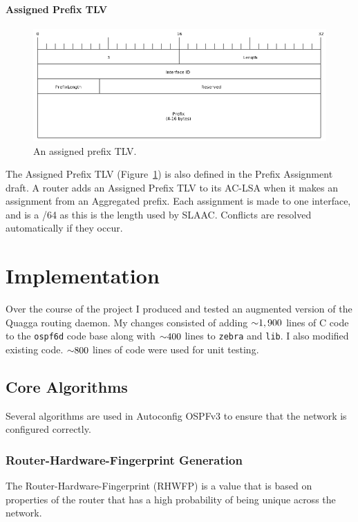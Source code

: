 \subsubsection{Assigned Prefix TLV}
\begin{figure}
\begin{center}
	\includegraphics[width=\linewidth]{../Diagrams/Packets/assigned_prefix_tlv.png}
	\caption{An assigned prefix TLV.}\label{fig:AssignedPrefix-TLV}
\end{center}
\end{figure}
The Assigned Prefix TLV (Figure~\ref{fig:AssignedPrefix-TLV}) is also defined
in the Prefix Assignment draft. A router adds an Assigned Prefix TLV to its
AC-LSA when it makes an assignment from an Aggregated prefix. Each assignment
is made to one interface, and is a /64 as this is the length used by SLAAC\@.
Conflicts are resolved automatically if they occur. 

\chapter{Implementation}
Over the course of the project I produced and tested an augmented version of
the Quagga routing daemon. My changes consisted of adding $\mathord{\sim}1,900$ lines
of C code to the \texttt{ospf6d} code base along with $\mathord{\sim}400$ lines to
\texttt{zebra} and \texttt{lib}. I also modified existing code. $\mathord{\sim}800$
lines of code were used for unit testing.

\section{Core Algorithms}
Several algorithms are used in Autoconfig OSPFv3 to ensure that the network
is configured correctly.

\subsection{Router-Hardware-Fingerprint Generation}
The Router-Hardware-Fingerprint (RHWFP) is a value that is based on properties of
the router that has a high probability of being unique across the network. 


